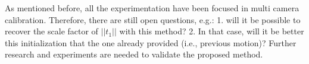 As mentioned before, all the experimentation have been focused in multi camera calibration.
Therefore, there are still open questions, e.g.: 1. will it be possible to recover the scale factor of $||t_1||$ with this method? 2. In that case, will it be better this initialization that the one already provided (i.e., previous motion)? Further research and experiments are needed to validate the proposed method.







